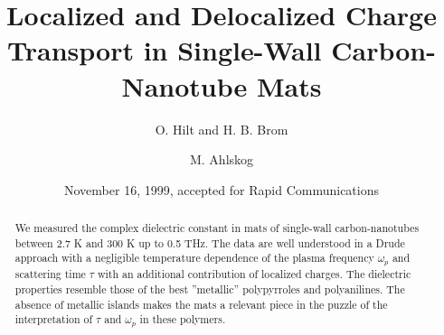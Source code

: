 
\draft

\title{Localized and Delocalized Charge Transport in Single-Wall Carbon-Nanotube Mats}
\author{O. Hilt and H. B. Brom}
\address{ Kamerlingh Onnes Laboratory, Leiden University, P.O. Box 9504, 2300 RA Leiden, The Netherlands}
\author{M. Ahlskog}
\address{ Low Temperature Laboratory, Helsinki University of Technology, FIN-02015 HUT, Finland}

\date{November 16, 1999, accepted for Rapid Communications}
\maketitle

\begin{abstract}
We measured the complex dielectric constant in mats of single-wall
carbon-nanotubes between 2.7 K and 300 K up to 0.5 THz. The data are well
understood in a Drude approach with a negligible temperature dependence of
the plasma frequency $\omega_p$ and scattering time $\tau$ with an additional
contribution of localized charges. The dielectric properties resemble those
of the best ''metallic'' polypyrroles and polyanilines. The absence of
metallic islands makes the mats a relevant piece in the puzzle of the
interpretation of $\tau$ and $\omega_p$ in these polymers.
\end{abstract}


